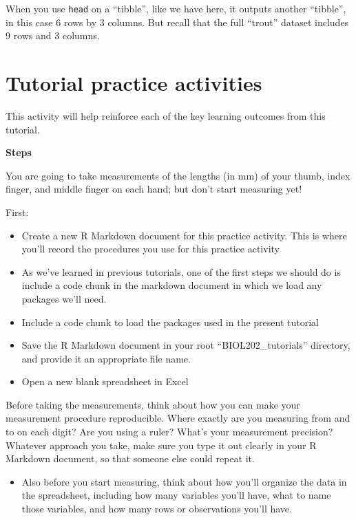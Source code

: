\documentclass[
]{book}
\providecommand{\tightlist}{%
  \setlength{\itemsep}{0pt}\setlength{\parskip}{0pt}}
\begin{document}
When you use \texttt{head} on a ``tibble'', like we have here, it outputs another ``tibble'', in this case 6 rows by 3 columns. But recall that the full ``trout'' dataset includes 9 rows and 3 columns.

\section{Tutorial practice activities}\label{tutorial-practice-activities}

This activity will help reinforce each of the key learning outcomes from this tutorial.

\textbf{Steps}

You are going to take measurements of the lengths (in mm) of your thumb, index finger, and middle finger on each hand; but don't start measuring yet!

First:

\begin{itemize}
\tightlist
\item
  Create a new R Markdown document for this practice activity. This is where you'll record the procedures you use for this practice activity
\item
  As we've learned in previous tutorials, one of the first steps we should do is include a code chunk in the markdown document in which we load any packages we'll need.
\item
  Include a code chunk to load the packages used in the present tutorial
\item
  Save the R Markdown document in your root ``BIOL202\_tutorials'' directory, and provide it an appropriate file name.
\item
  Open a new blank spreadsheet in Excel
\end{itemize}

Before taking the measurements, think about how you can make your measurement procedure reproducible. Where exactly are you measuring from and to on each digit? Are you using a ruler? What's your measurement precision? Whatever approach you take, make sure you type it out clearly in your R Markdown document, so that someone else could repeat it.

\begin{itemize}
\tightlist
\item
  Also before you start measuring, think about how you'll organize the data in the spreadsheet, including how many variables you'll have, what to name those variables, and how many rows or observations you'll have.
\end{itemize}
\end{document}
